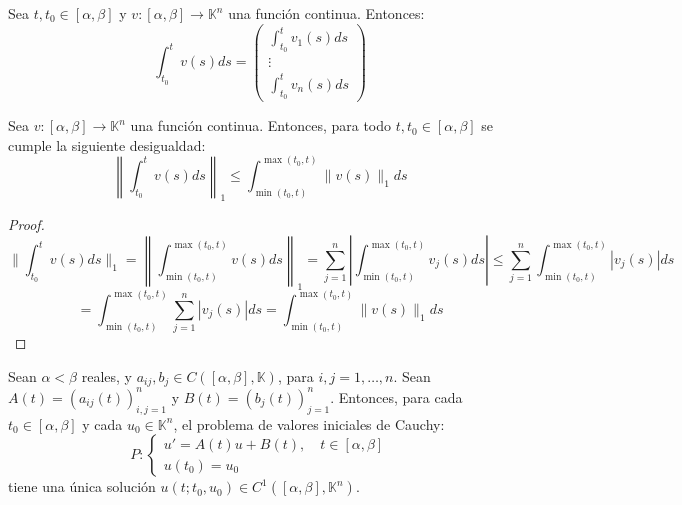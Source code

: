 Sea $t,t_0 \in [\alpha, \beta]$ y $v : [\alpha, \beta] \to \mathbb{K}^n$ una función continua. Entonces:
\[
    \int_{t_0}^{t} v(s) ds = \begin{pmatrix}
        \int_{t_0}^{t} v_1(s) ds \\
        \vdots \\
        \int_{t_0}^{t} v_n(s) ds
    \end{pmatrix}
\]

\begin{lema} 
    Sea $v : [\alpha, \beta] \to \mathbb{K}^n$ una función continua. Entonces, para todo $t, t_0 \in [\alpha, \beta]$ se cumple la siguiente desigualdad:
    \[
        \left\| \int_{t_0}^{t} v(s) ds \right\|_1 \leq \int_{\min(t_0,t)}^{\max(t_0,t)} \| v(s) \|_1 ds
    \]
\end{lema}

\begin{proof}
    \[
        \| \int_{t_0}^{t} v(s) ds \|_1 = \left\| \int_{\min(t_0,t)}^{\max(t_0,t)} v(s) ds \right\|_1 = \sum_{j=1}^{n} \left| \int_{\min(t_0,t)}^{\max(t_0,t)} v_j(s) ds \right| \leq \sum_{j=1}^{n} \int_{\min(t_0,t)}^{\max(t_0,t)} |v_j(s)| ds 
    \]
    \[
        = \int_{\min(t_0,t)}^{\max(t_0,t)} \sum_{j=1}^{n} |v_j(s)| ds = \int_{\min(t_0,t)}^{\max(t_0,t)} \| v(s) \|_1 ds
    \]
\end{proof}

\begin{teorema} 
    Sean $\alpha < \beta$ reales, y $a_{ij},b_j \in C([\alpha, \beta], \mathbb{K})$, para $i,j = 1, \ldots, n$. Sean $A(t) = (a_{ij}(t))_{i,j=1}^{n}$ y $B(t) = (b_j(t))_{j=1}^{n}$. Entonces, para cada $t_0 \in [\alpha, \beta]$ y cada $u_0 \in \mathbb{K}^n$, el problema de valores iniciales de Cauchy:
    \[
        P : \begin{cases}
            u' = A(t) u + B(t), \quad t \in [\alpha, \beta] \\
            u(t_0) = u_0
        \end{cases}
    \]
    tiene una única solución $u(t;t_0,u_0) \in C^{1}([\alpha, \beta], \mathbb{K}^n)$.    
\end{teorema}

